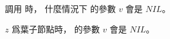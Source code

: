 \startEXERCISE
{} 調用  時，
什麼情況下  的參數 $v$ 會是 $NIL$。
\stopEXERCISE

\startANSWER
$z$ 爲葉子節點時，  的參數 $v$ 會是 $NIL$。
\stopANSWER
